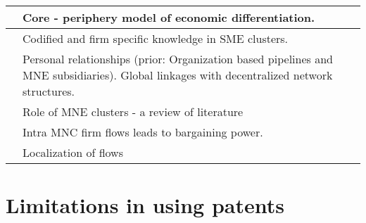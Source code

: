 \documentclass[12pt]{article}
\begin{document}
\begin{center}
\begin{longtable}{|p{}|p{}|p{}|}
\cite{Krugman1991a} & Core - periphery model of economic differentiation.&\\\hline

\cite{Lissoni2001} & Codified and firm specific knowledge in SME clusters.&\\\hline

\cite{Lorenzen2013} & Personal relationships (prior: Organization based pipelines and MNE subsidiaries). Global linkages with decentralized network structures.&\\\hline

\cite{Mudambi2012} & Role of MNE clusters - a review of literature&\\\hline

\cite{Mudambi2004} & Intra MNC firm flows leads to bargaining power.&\\\hline

\cite{Murata2014} & Localization of flows&\\\hline
\end{longtable}
\end{center}

\section{Limitations in using patents}
\cite{Griliches1990}
\cite{Scherer1984}
 

\end{document}
